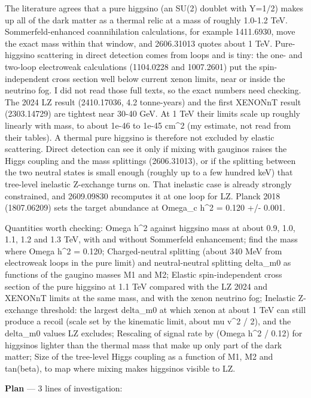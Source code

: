 \documentclass[11pt,a4paper]{article}
\begin{document}
The literature agrees that a pure higgsino (an SU(2) doublet with Y=1/2) makes up all of the dark matter as a thermal relic at a mass of roughly 1.0-1.2 TeV. Sommerfeld-enhanced coannihilation calculations, for example 1411.6930, move the exact mass within that window, and 2606.31013 quotes about 1 TeV. Pure-higgsino scattering in direct detection comes from loops and is tiny: the one- and two-loop electroweak calculations (1104.0228 and 1007.2601) put the spin-independent cross section well below current xenon limits, near or inside the neutrino fog. I did not read those full texts, so the exact numbers need checking. The 2024 LZ result (2410.17036, 4.2 tonne-years) and the first XENONnT result (2303.14729) are tightest near 30-40 GeV. At 1 TeV their limits scale up roughly linearly with mass, to about 1e-46 to 1e-45 cm\textasciicircum{}2 (my estimate, not read from their tables). A thermal pure higgsino is therefore not excluded by elastic scattering. Direct detection can see it only if mixing with gauginos raises the Higgs coupling and the mass splittings (2606.31013), or if the splitting between the two neutral states is small enough (roughly up to a few hundred keV) that tree-level inelastic Z-exchange turns on. That inelastic case is already strongly constrained, and 2609.09830 recomputes it at one loop for LZ. Planck 2018 (1807.06209) sets the target abundance at Omega\_c h\textasciicircum{}2 = 0.120 +/- 0.001.

Quantities worth checking: Omega h\textasciicircum{}2 against higgsino mass at about 0.9, 1.0, 1.1, 1.2 and 1.3 TeV, with and without Sommerfeld enhancement; find the mass where Omega h\textasciicircum{}2 = 0.120; Charged-neutral splitting (about 340 MeV from electroweak loops in the pure limit) and neutral-neutral splitting delta\_m0 as functions of the gaugino masses M1 and M2; Elastic spin-independent cross section of the pure higgsino at 1.1 TeV compared with the LZ 2024 and XENONnT limits at the same mass, and with the xenon neutrino fog; Inelastic Z-exchange threshold: the largest delta\_m0 at which xenon at about 1 TeV can still produce a recoil (scale set by the kinematic limit, about mu v\textasciicircum{}2 / 2), and the delta\_m0 values LZ excludes; Rescaling of signal rate by (Omega h\textasciicircum{}2 / 0.12) for higgsinos lighter than the thermal mass that make up only part of the dark matter; Size of the tree-level Higgs coupling as a function of M1, M2 and tan(beta), to map where mixing makes higgsinos visible to LZ.

\textbf{Plan} --- 3 lines of investigation:
\end{document}
